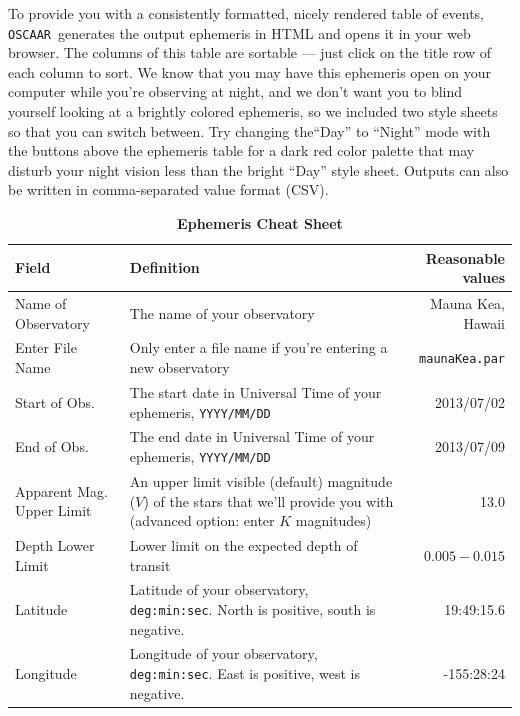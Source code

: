 \documentclass[a4paper]{article}
\newcommand{\code}[1]{\texttt{#1}}
\newcommand{\oscaar}{\code{OSCAAR}~}
\begin{document}
To provide you with a consistently formatted, nicely rendered table of events, \oscaar generates the output ephemeris in HTML and opens it in your web browser. The columns of this table are sortable --- just click on the title row of each column to sort. We know that you may have this ephemeris open on your computer while you're observing at night, and we don't want you to blind yourself looking at a brightly colored ephemeris, so we included two style sheets so that you can switch between. Try changing the``Day'' to ``Night'' mode with the buttons above the ephemeris table for a dark red color palette that may disturb your night vision less than the bright ``Day'' style sheet. Outputs can also be written in comma-separated value format (CSV).

\pagebreak
\begin{table}[H]
\renewcommand{\arraystretch}{1.4}
\centering
\caption{\textbf{Ephemeris Cheat Sheet}}
\begin{tabular}{p{0.8in} p{3.2in} r}
Field & Definition & Reasonable values\\
\hline\hline
Name of Observatory & The name of your observatory & Mauna Kea, Hawaii\\
Enter File Name & Only enter a file name if you're entering a new observatory & \code{maunaKea.par}\\
Start of Obs. & The start date in Universal Time of your ephemeris, \code{YYYY/MM/DD} & 2013/07/02\\
End of Obs. & The end date in Universal Time of your ephemeris, \code{YYYY/MM/DD} &  2013/07/09\\
Apparent Mag. Upper Limit & An upper limit visible (default) magnitude ($V$) of the stars that we'll provide you with (advanced option: enter $K$ magnitudes) & 13.0\\
Depth Lower Limit & Lower limit on the expected depth of transit & $0.005-0.015$\\
\hline 
Latitude & Latitude of your observatory, \code{deg:min:sec}. North is positive, south is negative. & 19:49:15.6\\
Longitude & Longitude of your observatory, \code{deg:min:sec}. East is positive, west is negative. & -155:28:24\\

\end{tabular}
\end{table}
\end{document}
